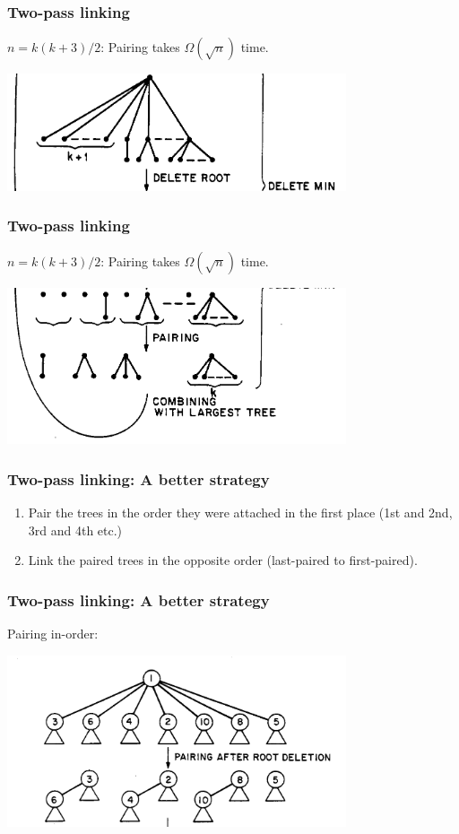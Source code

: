\documentclass{beamer}
\begin{document}
\begin{frame}
\frametitle{Two-pass linking}

$n = k(k+3)/2$: Pairing takes $\Omega(\sqrt{n})$ time.

\includegraphics[width=10cm]{fig5-2.png}

\end{frame}
 
\begin{frame}
\frametitle{Two-pass linking}

$n = k(k+3)/2$: Pairing takes $\Omega(\sqrt{n})$ time.

\includegraphics[width=10cm]{fig5-3.png}

\end{frame}
 
\begin{frame}
\frametitle{Two-pass linking: A better strategy}

\begin{enumerate}
\item Pair the trees in the order they were attached in the first place (1st and 2nd,
3rd and 4th etc.)

\item Link the paired trees in the opposite order (last-paired to first-paired).
\end{enumerate}
\end{frame}

\begin{frame}
\frametitle{Two-pass linking: A better strategy}

Pairing in-order:

\includegraphics[width=10cm]{fig6-1.png}

\end{frame}
\end{document}
